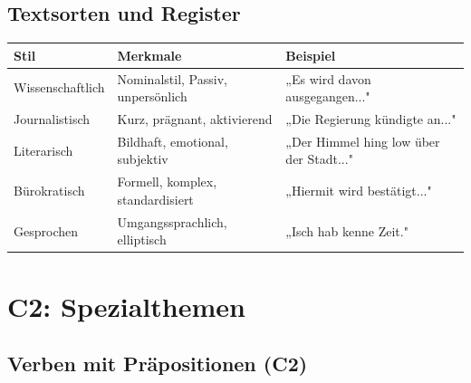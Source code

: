 \section{Textsorten und Register}
\label{sec:C2Register}

\bigskip
\begin{center}
\begin{tabular}{|l|p{5cm}|p{5cm}|}
\hline
Stil & Merkmale & Beispiel \\ \hline
Wissenschaftlich & Nominalstil, Passiv, unpersönlich & „Es wird davon ausgegangen..." \\ \hline
Journalistisch & Kurz, prägnant, aktivierend & „Die Regierung kündigte an..." \\ \hline
Literarisch & Bildhaft, emotional, subjektiv & „Der Himmel hing low über der Stadt..." \\ \hline
Bürokratisch & Formell, komplex, standardisiert & „Hiermit wird bestätigt..." \\ \hline
Gesprochen & Umgangssprachlich, elliptisch & „Isch hab kenne Zeit." \\ \hline
\end{tabular}
\end{center}

\chapterend

\chapter{C2: Spezialthemen}
\label{cha:C2Spezial}

\section{Verben mit Präpositionen (C2)}
\label{sec:C2VerbPraep}


